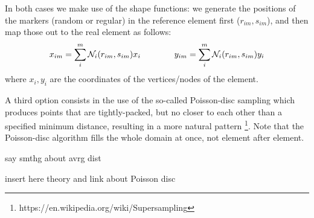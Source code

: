 In both cases we make use of the shape functions: we generate the 
positions of the markers (random or regular) in the reference
element first ($r_{im},s_{im}$), and then map those out to the real element as follows:
\begin{equation}
x_{im}=\sum_i^m {\mathcal{N}}_i(r_{im},s_{im}) x_i
\quad\quad\quad\quad
y_{im}=\sum_i^m {\mathcal{N}}_i(r_{im},s_{im}) y_i
\end{equation}
where $x_i,y_i$ are the coordinates of the vertices/nodes of the element.

A third option consists in the use of the so-called Poisson-disc sampling which 
produces points that are tightly-packed, but no closer to each other than 
a specified minimum distance, resulting in a more natural pattern 
\footnote{https://en.wikipedia.org/wiki/Supersampling}. Note that 
the Poisson-disc algorithm fills the whole domain at once, not element after element.

{\color{red} say smthg about avrg dist}  

{\color{red} insert here theory and link about Poisson disc }

